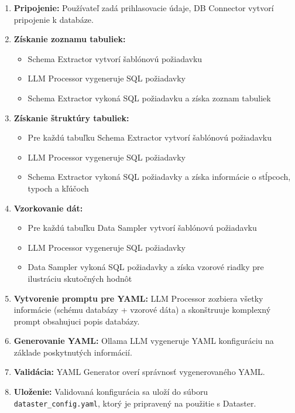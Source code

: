 \begin{enumerate}
\item \textbf{Pripojenie:} Používateľ zadá prihlasovacie údaje, DB Connector vytvorí pripojenie k databáze.

\item \textbf{Získanie zoznamu tabuliek:}
\begin{itemize}
\item Schema Extractor vytvorí šablónovú požiadavku
\item LLM Processor vygeneruje SQL požiadavky
\item Schema Extractor vykoná SQL požiadavku a získa zoznam tabuliek
\end{itemize}

\item \textbf{Získanie štruktúry tabuliek:}
\begin{itemize}
\item Pre každú tabuľku Schema Extractor vytvorí šablónovú požiadavku
\item LLM Processor vygeneruje SQL požiadavky 
\item Schema Extractor vykoná SQL požiadavky a získa informácie o stĺpcoch, typoch a kľúčoch
\end{itemize}

\item \textbf{Vzorkovanie dát:}
\begin{itemize}
\item Pre každú tabuľku Data Sampler vytvorí šablónovú požiadavku
\item LLM Processor vygeneruje SQL požiadavky
\item Data Sampler vykoná SQL požiadavky a získa vzorové riadky pre ilustráciu skutočných hodnôt
\end{itemize}

\item \textbf{Vytvorenie promptu pre YAML:} LLM Processor zozbiera všetky informácie (schému databázy + vzorové dáta) a skonštruuje komplexný prompt obsahujuci popis databázy.

\item \textbf{Generovanie YAML:} Ollama LLM vygeneruje YAML konfiguráciu na základe poskytnutých informácií.

\item \textbf{Validácia:} YAML Generator overí správnosť vygenerovaného YAML.

\item \textbf{Uloženie:} Validovaná konfigurácia sa uloží do súboru \texttt{dataster\_config.yaml}, ktorý je pripravený na použitie s Dataster.
\end{enumerate}


